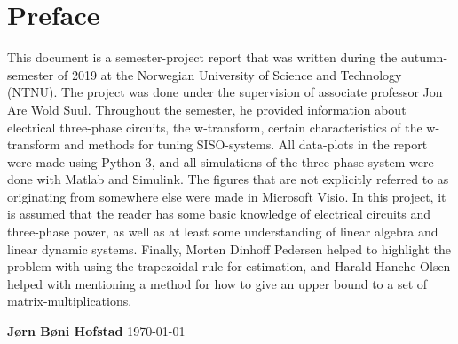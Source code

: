 \chapter{Preface}
This document is a semester-project report that was written during the autumn-semester of 2019 at the Norwegian University of Science and Technology (NTNU). The project was done under the supervision of associate professor Jon Are Wold Suul. Throughout the semester, he provided information about electrical three-phase circuits, the w-transform, certain characteristics of the w-transform and methods for tuning SISO-systems. All data-plots in the report were made using Python 3, and all simulations of the three-phase system were done with Matlab and Simulink. The figures that are not explicitly referred to as originating from somewhere else were made in Microsoft Visio. In this project, it is assumed that the reader has some basic knowledge of electrical circuits and three-phase power, as well as at least some understanding of linear algebra and linear dynamic systems. Finally, Morten Dinhoff Pedersen helped to highlight the problem with using the trapezoidal rule for estimation, and Harald Hanche-Olsen helped with mentioning a method for how to give an upper bound to a set of matrix-multiplications. 


\begin{center}
 \textbf{Jørn Bøni Hofstad}
 \today
\end{center}